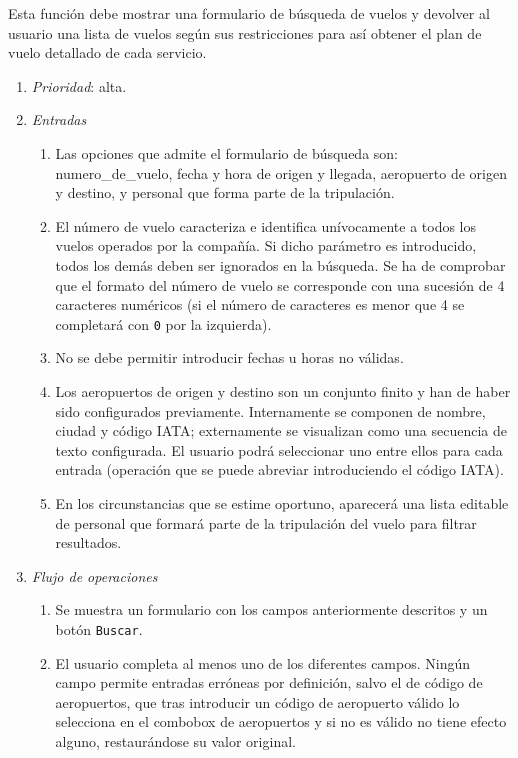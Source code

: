 	Esta función debe mostrar una formulario de búsqueda de vuelos y devolver al usuario una lista de vuelos según sus restricciones para así obtener el plan de vuelo detallado de cada servicio.

\begin{enumerate}
	\item \textit{Prioridad}: alta.
	\item \textit{Entradas}
	\begin{enumerate}
		\item Las opciones que admite el formulario de búsqueda son: \gls{numero_de_vuelo}, fecha y hora de origen y llegada, aeropuerto de origen y destino, y personal que forma parte de la tripulación.
		\item El número de vuelo caracteriza e identifica unívocamente a todos los vuelos operados por la compañía. Si dicho parámetro es introducido, todos los demás deben ser ignorados en la búsqueda. Se ha de comprobar que el formato del número de vuelo se corresponde con una sucesión de 4 caracteres numéricos (si el número de caracteres es menor que 4 se completará con \verb|0| por la izquierda).
		\item No se debe permitir introducir fechas u horas no válidas.
		\item Los aeropuertos de origen y destino son un conjunto finito y han de haber sido configurados previamente. Internamente se componen de nombre, ciudad y código \gls{IATA}; externamente se visualizan como una secuencia de texto configurada. El usuario podrá seleccionar uno entre ellos para cada entrada (operación que se puede abreviar introduciendo el código IATA).
		\item En los circunstancias que se estime oportuno, aparecerá una lista editable de personal que formará parte de la tripulación del vuelo para filtrar resultados.
	\end{enumerate}
	\item \textit{Flujo de operaciones}
	\begin{enumerate}
		\item Se muestra un formulario con los campos anteriormente descritos y un botón \verb|Buscar|.
		\item El usuario completa al menos uno de los diferentes campos. Ningún campo permite entradas erróneas por definición, salvo el de código de aeropuertos, que tras introducir un código de aeropuerto válido lo selecciona en el \gls{combobox} de aeropuertos y si no es válido no tiene efecto alguno, restaurándose su valor original.

\end{enumerate}
\end{enumerate}
